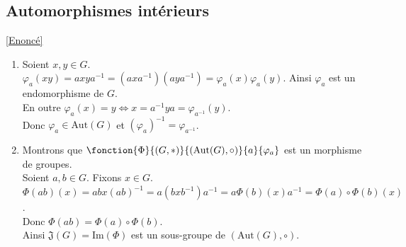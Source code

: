 \documentclass[8pt]{book}
\begin{document}
	\subsection{Automorphismes intérieurs }
	\label{Automorphismes intérieurs corrigé}
	\textcolor{blue}{\hyperref[Automorphismes intérieurs]{[Enoncé]}}\\
	\begin{enumerate}[leftmargin=*]
		\item Soient $x,y\in G$.\\
		$\varphi_a(xy)=axya^{-1}=(axa^{-1})(aya^{-1})=\varphi_a(x)\varphi_a(y)$. Ainsi $\varphi_a$ est un endomorphisme de $G$.\\
		En outre $\varphi_a(x)=y\iff x=a^{-1}ya=\varphi_{a^{-1}}(y)$.\\
		Donc $\varphi_a\in \text{Aut}(G)$ et $(\varphi_a)^{-1}=\varphi_{a^{-1}}$.
		\item Montrons que $\fonction{\Phi}{(G,*)}{(\text{Aut}(G),\circ)}{a}{\varphi_a}$ est un morphisme de groupes.\\
		Soient $a,b\in G$. Fixons $x\in G$.\\
		$\Phi(ab)(x)=abx(ab)^{-1}=a(bxb^{-1})a^{-1}=a\Phi(b)(x)a^{-1}=\Phi(a)\circ\Phi(b)(x)$.\\
		Donc $\Phi(ab)=\Phi(a)\circ\Phi(b)$.\\
		Ainsi $\mathfrak{J}(G)=\text{Im}(\Phi)$ est un sous-groupe de $(\text{Aut}(G),\circ)$.
	\end{enumerate}
	
\end{document}
